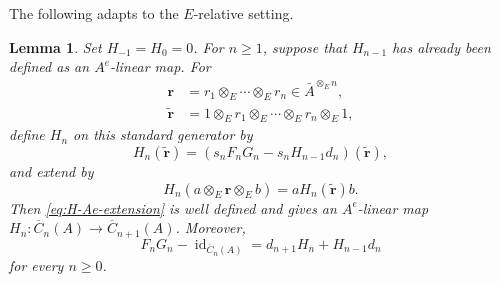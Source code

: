 \documentclass[11pt,a4paper,reqno]{amsart}
\newcommand{\id}{\operatorname{id}}
\theoremstyle{plain}
\newtheorem{lemma}[lemma]{Lemma}
\theoremstyle{definition}
\numberwithin{equation}{section}
\begin{document}
	The following adapts \cite[Lemma~3.1]{RR22} to the $E$-relative setting.
	
	\begin{lemma}
		\label{lem:relative-recursive-homotopy}
		Set $H_{-1}=H_0=0$.  For $n\geq1$, suppose that $H_{n-1}$ has already
		been defined as an $A^e$-linear map.  For
		\[
		\begin{aligned}
			\mathbf r&=r_1\otimes_E\cdots\otimes_E r_n
			\in\bar A^{\otimes_E n},\\
			\widetilde{\mathbf r}
			&=1\otimes_Er_1\otimes_E\cdots\otimes_Er_n\otimes_E1,
		\end{aligned}
		\]
		define $H_n$ on this standard generator by
		\begin{equation}\label{eq:recursive-H}
			H_n(\widetilde{\mathbf r})
			=
			(s_nF_nG_n-s_nH_{n-1}d_n)
			(\widetilde{\mathbf r}),
		\end{equation}
		and extend by
		\begin{equation}\label{eq:H-Ae-extension}
			H_n(a\otimes_E\mathbf r\otimes_Eb)
			=
			a H_n(\widetilde{\mathbf r}) b.
		\end{equation}
		Then \eqref{eq:H-Ae-extension} is well defined and gives an $A^e$-linear
		map
		$H_n:\overline C_n(A)\longrightarrow\overline C_{n+1}(A)$.
		Moreover,
		\begin{equation}\label{eq:FG-homotopy}
			F_nG_n-\id_{\overline C_n(A)}
			=
			d_{n+1}H_n+H_{n-1}d_n
		\end{equation}
		for every $n\geq0$.
	\end{lemma}
	
\end{document}

